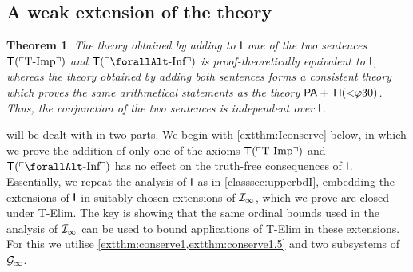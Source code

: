\documentclass[UKenglish,cleveref,DIV=12]{scrartcl}
\let\forall\forallAlt
\newtheorem{theorem}{Theorem}
\theoremstyle{definition}
\theoremstyle{definition}
\begin{document}
\subsection{A weak extension of the theory \tI}\label{extsec:extendI}
\begin{theorem}\label{extthm:conserve2}
The theory obtained by adding to $\mathsf{I}$ one of the two
sentences $\mathsf{T}(\ulcorner{\textup{T-Imp}}\urcorner)$ and $\T(\gn{\textup{$\forall$-Inf}})$ is
proof-theoretically equivalent to $\mathsf{I}$, whereas the theory obtained by adding both
sentences forms a consistent theory which proves the same arithmetical
statements as the theory $\mathsf{PA}+\mathsf{TI}(\mathord< \varphi30)$. Thus, the conjunction
of the two sentences is independent over $\mathsf{I}$.
\end{theorem}
 will be dealt with in two parts. We begin with
\cref{extthm:Iconserve} below, in which we prove the addition of only one of the
axioms $\mathsf{T}(\ulcorner{\text{T-Imp}}\urcorner)$ and $\T(\gn{\text{$\forall$-Inf}})$ has no effect
on the truth-free consequences of $\mathsf{I}$. Essentially, we repeat the analysis of
$\mathsf{I}$ as in \cref{classsec:upperbdI}, embedding the extensions of $\mathsf{I}$ in
suitably chosen extensions of $\mathcal{I}_\infty$, which we prove are closed under T-Elim.
The key is showing that the same ordinal bounds used in the analysis of $\mathcal{I}_\infty$ can be used to bound applications of
T-Elim in these extensions. For this we utilise
\cref{extthm:conserve1,extthm:conserve1.5} and two subsystems of $\mathcal{G}_\infty$.
\end{document}
